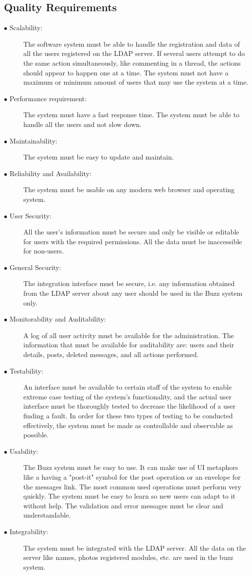 \documentclass[hidelinks, 12pt]{article}
\begin{document}
\subsection{Quality Requirements}
\begin{description}
  \item[$\bullet$ Scalability:] 
        The software system must be able to handle the registration and data of all the users registered on the LDAP server. 
       If several users attempt to do the same action simultaneously, like commenting in a thread, the actions should appear to happen one at a time. 
      The system must not have a maximum or minimum amount of users that may use the system at a time.
  \item[$\bullet$ Performance requirement:]
      The system must have a fast response time. The system must be able to handle all the users and not slow down.
  \item[$\bullet$ Maintainability:] 
      The system must be easy to update and maintain.
  \item[$\bullet$ Reliability and Availability:]
      The system must be usable on any modern web browser and operating system.
  \item[$\bullet$ User Security:]
      All the user's information must be secure and only be visible or editable for users with the required permissions. All the data must be inaccessible for non-users.
  \item[$\bullet$ General Security:]
The integration interface must be secure, i.e. any information obtained from the LDAP server about any user should be used in the Buzz system only.
  \item[$\bullet$ Monitorability and Auditability:]
      A log of all user activity must be available for the administration. The information that must be available for auditability are: users and their details, posts, deleted messages, and all actions performed.
  \item[$\bullet$ Testability:]
      An interface must be available to certain staff of the system to enable extreme case testing of the system's functionality, and the actual user interface must be thoroughly tested to decrease the likelihood of a user finding a fault. In order for these two types of testing to be conducted effectively, the system must be made as controllable and observable as possible.
  \item[$\bullet$ Usability:]
      The Buzz system must be easy to use. It can make use of UI metaphors like a having a "post-it" symbol for the post operation or an envelope for the messages link.
      The most common used operations must perform very quickly. The system must be easy to learn so new users can adapt to it without help. 
      The validation and error messages must be clear and understandable.
  \item[$\bullet$ Integrability:]
      The system must be integrated with the LDAP server. 
      All the data on the server like names, photos registered modules, etc. are used in the buzz system. 
\end{description}
\end{document}

